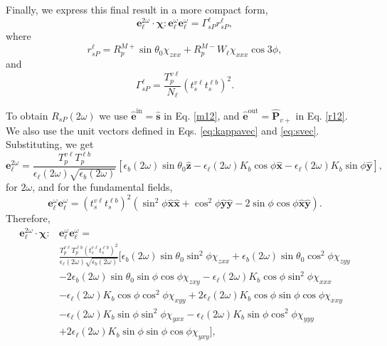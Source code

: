 Finally, we express this final result in a more compact form,
\begin{equation}
\mathbf{e}^{2\omega}_{\ell}\cdot\boldsymbol{\chi}:
\mathbf{e}^{\omega}_{\ell}\mathbf{e}^{\omega}_{\ell} =
\Gamma^{\ell}_{sP}r^{\ell}_{sP},
\end{equation}
where
\begin{equation}
r^{\ell}_{sP} = 
R^{M+}_{p}\sin\theta_{0}\chi_{zxx} + R^{M-}_{p}W_{\ell}\chi_{xxx}\cos3\phi,
\end{equation}
and
\begin{equation}
\Gamma^{\ell}_{sP} = 
\frac{T^{v\ell}_{p}}{N_{\ell}}
\left(t^{v\ell}_{s}t^{\ell b}_{s}\right)^{2}.
\end{equation}

To obtain $R_{sP}(2\omega)$ we use
$\hat{\mathbf{e}}^{\mathrm{in}}=\hat{\mathbf{s}}$ in Eq. \eqref{m12}, and
$\hat{\mathbf{e}}^{\mathrm{out}}=\hat{\mathbf{P}}_{v+}$ in Eq. \eqref{r12}. We
also use the unit vectors defined in Eqs. \eqref{eq:kappavec} and
\eqref{eq:svec}. Substituting, we get
\begin{equation*}
\mathbf{e}^{2\omega}_{\ell} 
= \frac{T^{v\ell}_{p}T^{\ell b}_{p}}
       {\epsilon_{\ell}(2\omega)\sqrt{\epsilon_{b}(2\omega)}}
\left[
  \epsilon_{b}(2\omega)\sin\theta_{0}\hat{\mathbf{z}} 
- \epsilon_{\ell}(2\omega)K_{b}\cos\phi\hat{\mathbf{x}} 
- \epsilon_{\ell}(2\omega)K_{b}\sin\phi\hat{\mathbf{y}}
\right],
\end{equation*}
for $2\omega$, and for the fundamental fields,
\begin{equation*}
\mathbf{e}^{\omega}_{\ell}\mathbf{e}^{\omega}_{\ell}
= \left(t^{v\ell}_{s}t^{\ell b}_{s}\right)^{2}
\left(
  \sin^{2}\phi\hat{\mathbf{x}}\hat{\mathbf{x}}
+ \cos^{2}\phi\hat{\mathbf{y}}\hat{\mathbf{y}} 
- 2\sin\phi\cos\phi\hat{\mathbf{x}}\hat{\mathbf{y}}
\right).
\end{equation*}
Therefore,
\begin{equation*}
\begin{split}
\mathbf{e}^{2\omega}_{\ell}
\cdot\boldsymbol{\chi}:&
\mathbf{e}^{\omega}_{\ell}\mathbf{e}^{\omega}_{\ell} =\\
&\frac{T^{v\ell}_{p}T^{\ell b}_{p}\left(t^{v\ell}_{s}t^{\ell b}_{s}\right)^{2}}
      {\epsilon_{\ell}(2\omega)\sqrt{\epsilon_{b}(2\omega)}}
\big[
   \epsilon_{b}(2\omega)\sin\theta_{0}\sin^{2}\phi\chi_{zxx} 
 + \epsilon_{b}(2\omega)\sin\theta_{0}\cos^{2}\phi\chi_{zyy}\\
&- 2\epsilon_{b}(2\omega)\sin\theta_{0}\sin\phi\cos\phi\chi_{zxy}
 - \epsilon_{\ell}(2\omega)K_{b}\cos\phi\sin^{2}\phi\chi_{xxx}\\
&- \epsilon_{\ell}(2\omega)K_{b}\cos\phi\cos^{2}\phi\chi_{xyy}
 + 2\epsilon_{\ell}(2\omega)K_{b}\cos\phi\sin\phi\cos\phi\chi_{xxy}\\
&- \epsilon_{\ell}(2\omega)K_{b}\sin\phi\sin^{2}\phi\chi_{yxx}
 - \epsilon_{\ell}(2\omega)K_{b}\sin\phi\cos^{2}\phi\chi_{yyy}\\
&+ 2\epsilon_{\ell}(2\omega)K_{b}\sin\phi\sin\phi\cos\phi\chi_{yxy}
\big],
\end{split}
\end{equation*}
